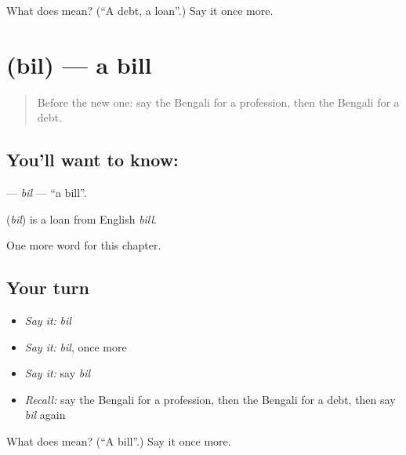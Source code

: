 \begin{tcolorbox}[breakable,colback=teal!4,colframe=teal!35!black,title={Before you move on}]
What does  mean? (\textquotedblleft{}A debt, a loan\textquotedblright{}.) Say it once more.
\end{tcolorbox}
\section[\texorpdfstring{\bn{বিল} (bil)}{বিল (bil)}]{ (bil) — a bill}

\label{lesson:BN-C176-bil}



\begin{quote}
Before the new one: say the Bengali for a profession, then the Bengali for a debt.
\end{quote}

\subsection*{You'll want to know: }
\textbf{} — \emph{bil} — \textquotedblleft{}a bill\textquotedblright{}.

\begin{cousinweb}
\textbf{} (\emph{bil}) is a loan from English \emph{bill}.
\end{cousinweb}

\begin{grammarlens}[title={What you've built}]
One more word for this chapter.
\end{grammarlens}

\subsection*{Your turn}
\begin{itemize}
\raggedright
  \item \emph{Say it:} \emph{bil}
  \item \emph{Say it:} \emph{bil}, once more
  \item \emph{Say it:} say \emph{bil}
  \item \emph{Recall:} say the Bengali for a profession, then the Bengali for a debt, then say \emph{bil} again
\end{itemize}

\begin{tcolorbox}[breakable,colback=teal!4,colframe=teal!35!black,title={Before you move on}]
What does  mean? (\textquotedblleft{}A bill\textquotedblright{}.) Say it once more.
\end{tcolorbox}
